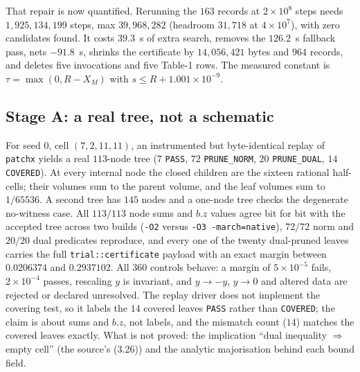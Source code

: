\documentclass[10pt]{article}
\theoremstyle{definition}
\newcommand{\file}[1]{\texttt{\small #1}}
\begin{document}
That repair is now quantified. Rerunning the $163$ records at $2\times10^8$ steps needs
$1{,}925{,}134{,}199$ steps, max $39{,}968{,}282$ (headroom $31{,}718$ at $4\times10^7$), with zero
candidates found. It costs $39.3$~s of extra search, removes the $126.2$~s fallback pass, nets
$-91.8$~s, shrinks the certificate by $14{,}056{,}421$ bytes and $964$ records, and deletes five
invocations and five Table-1 rows. The measured constant is $\tau=\max(0,R-X_M)$ with
$s\le R+1.001\times10^{-9}$.

\subsection{Stage A: a real tree, not a schematic}
For seed $0$, cell $(7,2,11,11)$, an instrumented but byte-identical replay of \file{patchx} yields a
real $113$-node tree ($7$ \texttt{PASS}, $72$ \texttt{PRUNE\_NORM}, $20$ \texttt{PRUNE\_DUAL},
$14$ \texttt{COVERED}). At every internal node the closed children are the sixteen rational half-cells;
their volumes sum to the parent volume, and the leaf volumes sum to $1/65536$. A second tree has $145$
nodes and a one-node tree checks the degenerate no-witness case. All $113/113$ node sums and $b.z$
values agree bit for bit with the accepted tree across two builds (\texttt{-O2} versus
\texttt{-O3 -march=native}), $72/72$ norm and $20/20$ dual predicates reproduce, and every one of the
twenty dual-pruned leaves carries the full \file{trial::certificate} payload with an exact margin
between $0.0206374$ and $0.2937102$. All $360$ controls behave: a margin of $5\times10^{-5}$ fails,
$2\times10^{-4}$ passes, rescaling $y$ is invariant, and $y\to-y$, $y\to0$ and altered data are
rejected or declared unresolved. The replay driver does not implement the covering test, so it labels
the $14$ covered leaves \texttt{PASS} rather than \texttt{COVERED}; the claim is about sums and $b.z$,
not labels, and the mismatch count ($14$) matches the covered leaves exactly. What is not proved: the
implication ``dual inequality $\Rightarrow$ empty cell'' (the source's (3.26)) and the analytic
majorisation behind each bound field.
\end{document}
